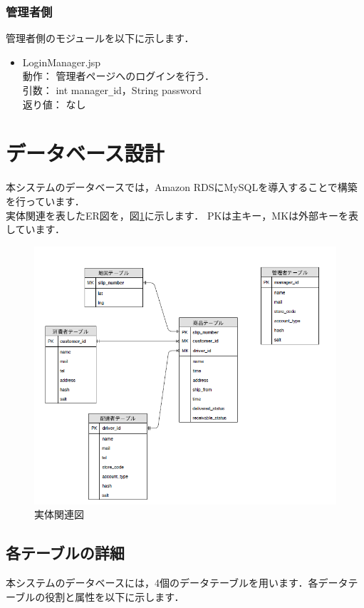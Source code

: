 \documentclass[a4j,titlepage]{jarticle}
\begin{document}
\subsubsection{管理者側}
管理者側のモジュールを以下に示します．
\begin{itemize}
\item LoginManager.jsp\\
動作： 管理者ページへのログインを行う．\\
引数： int manager\verb|_|id，String password\\
返り値： なし
\end{itemize}


\section{データベース設計}
本システムのデータベースでは，Amazon RDSにMySQLを導入することで構築を行っています．\\
実体関連を表したER図を，図\ref{fig:erd}に示します．
PKは主キー，MKは外部キーを表しています．
\begin{figure}[H]
 \begin{center}
  \includegraphics[width=150mm]{erd.png}
  \caption{実体関連図}
  \label{fig:erd}
 \end{center}
\end{figure}
 
\subsection{各テーブルの詳細}
本システムのデータベースには，4個のデータテーブルを用います．各データテーブルの役割と属性を以下に示します．
\end{document}
